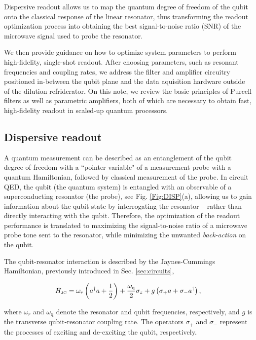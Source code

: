 \documentclass[aip,apr,twocolumn,showpacs,superscriptaddress,groupedaddress,nofootinbib,reprint]{revtex4-1}  %
\newcommand{\freq}{\omega_\text{q}}
\begin{document}
Dispersive readout allows us to map the quantum degree of freedom of the qubit onto the classical response of the linear resonator, thus transforming the readout optimization process into obtaining the best signal-to-noise ratio (SNR) of the microwave signal used to probe the resonator.

We then provide guidance on how to optimize system parameters to perform high-fidelity, single-shot readout. After choosing parameters, such as resonant frequencies and coupling rates, we address the filter and amplifier circuitry positioned in-between the qubit plane and the data aquisition hardware outside of the dilution refriderator. On this note, we review the basic principles of Purcell filters as well as parametric amplifiers, both of which are necessary to obtain fast, high-fidelity readout in scaled-up quantum processors.

\subsection{Dispersive readout}

A quantum measurement can be described as an entanglement of the qubit degree of freedom with a ``pointer variable" of a measurement probe with a quantum Hamiltonian\cite{Braginsky1996}, followed by classical measurement of the probe. In circuit QED, the qubit (the quantum system) is entangled with an observable of a superconducting resonator (the probe), see Fig. \ref{Fig:DISP}(a), allowing us to gain information about the qubit state by interrogating the resonator -- rather than directly interacting with the qubit. Therefore, the optimization of the readout performance is translated to maximizing the signal-to-noise ratio of a microwave probe tone sent to the resonator, while minimizing the unwanted \textit{back-action} on the qubit.

The qubit-resonator interaction is described by the Jaynes-Cummings Hamiltonian\cite{Jaynes1963,Shore1993,Gerry2005}, previously introduced in Sec. \ref{sec:circuits},

\begin{equation}
H_{\mbox{\tiny{JC}}} = \omega_r \left( a^{\dagger}a + \frac{1}{2}\right) + \frac{\freq}{2}\sigma_z + g \left( \sigma_{+}a + \sigma_{-}a^{\dagger}\right),
\label{Eq:JCH}
\end{equation}

\noindent where $\omega_r$ and $\freq$ denote the resonator and qubit frequencies, respectively, and $g$ is the transverse qubit-resonator coupling rate. The operators $\sigma_{+}$ and $\sigma_{-}$ represent the processes of exciting and de-exciting the qubit, respectively.
\end{document}
